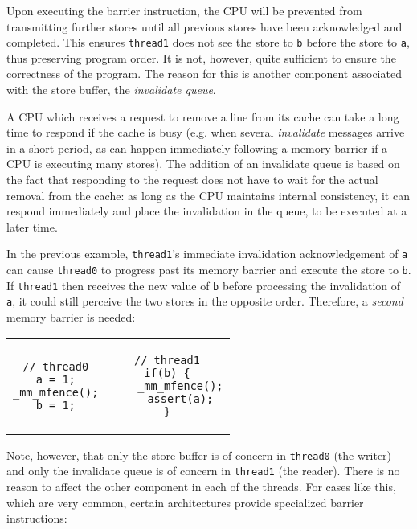Upon executing the barrier instruction, the CPU will be prevented from
transmitting further stores until all previous stores have been acknowledged and
completed.  This ensures \texttt{thread1} does not see the store to \texttt{b}
before the store to \texttt{a}, thus preserving program order.  It is not,
however, quite sufficient to ensure the correctness of the program.  The reason
for this is another component associated with the store buffer, the
\textit{invalidate queue}.

A CPU which receives a request to remove a line from its cache can take a long
time to respond if the cache is busy (e.g. when several \emph{invalidate}
messages arrive in a short period, as can happen immediately following a memory
barrier if a CPU is executing many stores).  The addition of an invalidate queue
is based on the fact that responding to the request does not have to wait for
the actual removal from the cache: as long as the CPU maintains internal
consistency, it can respond immediately and place the invalidation in the queue,
to be executed at a later time.

In the previous example, \texttt{thread1}'s immediate invalidation
acknowledgement of \texttt{a} can cause \texttt{thread0} to progress past its
memory barrier and execute the store to \texttt{b}.  If \texttt{thread1} then
receives the new value of \texttt{b} before processing the invalidation of
\texttt{a}, it could still perceive the two stores in the opposite order.
Therefore, a \emph{second} memory barrier is needed:

\begin{center}
    \begin{tabular}{cc}
        \begin{lstlisting}[style=c,showlines=true]
// thread0
a = 1;
_mm_mfence();
b = 1;

        \end{lstlisting}
        &
        \begin{lstlisting}[style=c]
// thread1
if(b) {
    _mm_mfence();
    assert(a);
}
        \end{lstlisting}
    \end{tabular}
\end{center}

Note, however, that only the store buffer is of concern in \texttt{thread0} (the
writer) and only the invalidate queue is of concern in \texttt{thread1} (the
reader).  There is no reason to affect the other component in each of the
threads.  For cases like this, which are very common, certain architectures
provide specialized barrier instructions:

